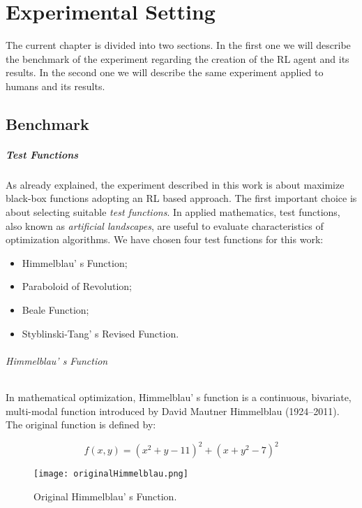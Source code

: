 \chapter{Experimental Setting}

The current chapter is divided into two sections. In the first one we will describe the benchmark of the experiment regarding the creation of the RL agent and its results. In the second one we will describe the same experiment applied to humans and its results.

\section{Benchmark}

\paragraph{Test Functions}

As already explained, the experiment described in this work is about maximize black-box functions adopting an RL based approach. The first important choice is about selecting suitable \textit{test functions}. In applied mathematics, test functions, also known as \textit{artificial landscapes}, are useful to evaluate characteristics of optimization algorithms. We have chosen four test functions for this work:

\begin{itemize}
	\item Himmelblau' s Function;
	\item Paraboloid of Revolution;
	\item Beale Function;
	\item Styblinski-Tang' s Revised Function.	
\end{itemize}

\subparagraph{Himmelblau' s Function} In mathematical optimization, Himmelblau' s function is a continuous, bivariate, multi-modal function introduced by David Mautner Himmelblau (1924–2011). The original function is defined by: 

\begin{equation}
	f(x, y) = (x^2 + y -11)^2 + (x + y^2 - 7)^2
\end{equation}

\begin{figure}[h!]
	\centering
	\texttt{[image: originalHimmelblau.png]}
	\caption{Original Himmelblau' s Function.}
	\label{fig:OriginalHimmelblauFunction}
\end{figure}

